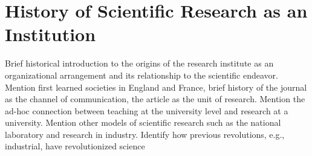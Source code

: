 \section{History of Scientific Research as an Institution}
Brief historical introduction to the origins of the research institute as an organizational arrangement and its relationship to the scientific endeavor. Mention first learned societies in England and France, brief history of the journal as the channel of communication, the article as the unit of research. Mention the ad-hoc connection between teaching at the university level and research at a university. Mention other models of scientific research such as the national laboratory and research in industry. Identify how previous revolutions, e.g., industrial, have revolutionized science 